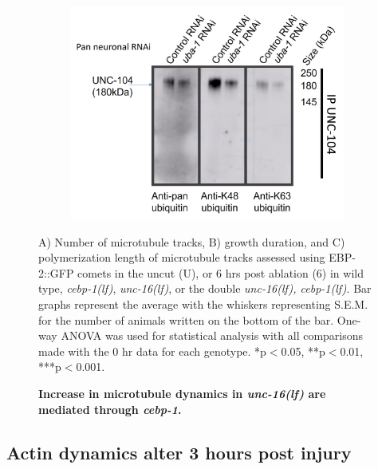 \begin{appendices}
\begin{figure}[H]
\begin{subfigure}{0.32\textwidth}
		\end{subfigure}
		\begin{subfigure}{0.32\textwidth}
			\caption{}
			\includegraphics[width=\textwidth]{figs/example}
			
		\end{subfigure}
		
		\caption[Increase in microtubule dynamics in \textit{unc-16(lf)} are mediated through \textit{cebp-1}.]{\textbf{Increase in microtubule dynamics in \textit{unc-16(lf)} are mediated through \textit{cebp-1}.}} \raggedright \small A) Number of microtubule tracks, B) growth duration, and C) polymerization length of microtubule tracks assessed using EBP-2::GFP comets in the uncut (U), or 6 hrs post ablation (6) in wild type, \textit{cebp-1(lf)}, \textit{unc-16(lf)}, or the double \textit{unc-16(lf), cebp-1(lf)}. Bar graphs represent the average with the whiskers representing S.E.M. for the number of animals written on the bottom of the bar. One-way ANOVA was used for statistical analysis with all comparisons made with the 0 hr data for each genotype. *p$<$0.05, **p$<$0.01, ***p$<$0.001.
		\label{fig:MTdyncebp}
	\end{figure}
	
	\subsection{Actin dynamics alter 3 hours post injury}
	

\end{appendices}

